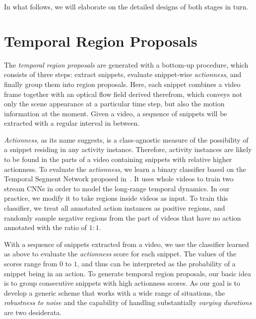 \documentclass[10pt,twocolumn,letterpaper]{article}
\begin{document}
In what follows, we will elaborate on the detailed designs of both stages in turn.   


 
\section{Temporal Region Proposals}
\label{sec:proposal}




The \emph{temporal region proposals} are generated with a bottom-up procedure,
which consists of three steps: 
extract snippets, evaluate snippet-wise \emph{actionness}, and 
finally group them into region proposals. 
Here, each snippet combines a video frame together with an optical flow field
derived therefrom, which conveys not only the scene appearance at a particular time step, 
but also the motion information at the moment. 
Given a video, a sequence of snippets will be extracted with a regular interval in between. 

\emph{Actionness}, as its name suggests, is a class-agnostic measure of the possibility of a snippet residing in any activity instance.
Therefore, activity instances are likely to be found in the parts of a video containing snippets with relative higher actionness.
To evaluate the \emph{actionness}, we learn a binary classifier based on 
the Temporal Segment Network proposed in~\cite{Wang2016TSN}.
It uses whole videos to train two stream CNNs in order to model the long-range temporal dynamics.
In our practice, we modify it to take regions inside videos as input.
To train this classifier, we treat all annotated action instances
as positive regions, and randomly sample negative regions from the part of videos that have no action annotated with the ratio of $ 1:1 $. 



With a sequence of snippets extracted from a video, 
we use the classifier learned as above to evaluate the \emph{actionness} score
for each snippet. 
The values of the scores range from $0$ to $1$, and thus can be interpreted
as the probability of a snippet being in an action.
To generate temporal region proposals, our basic idea is to 
group consecutive snippets with high actionness scores. 
As our goal is to develop a generic scheme that works with a wide range of 
situations, the \emph{robustness to noise} and the capability of handling 
substantially \emph{varying durations} are two desiderata.
\end{document}

